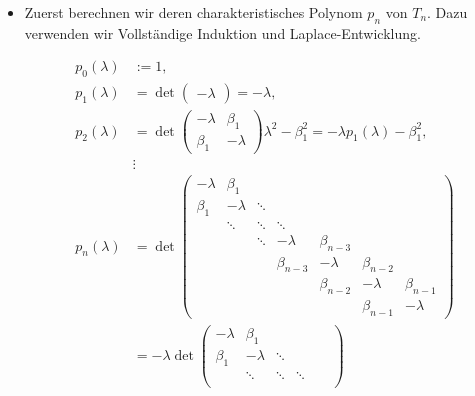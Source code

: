 \begin{solution}
\begin{itemize}

  \item Zuerst berechnen wir deren charakteristisches Polynom $p_n$ von $T_n$.
  Dazu verwenden wir Vollständige Induktion und Laplace-Entwicklung.

  \begin{align*}
    p_0(\lambda)
    & :=
    1, \\
    p_1(\lambda)
    & =
    \det
    \begin{pmatrix}
      -\lambda
    \end{pmatrix}
    =
    -\lambda, \\
    p_2(\lambda)
    & =
    \det
    \begin{pmatrix}
      -\lambda & \beta_1 \\
      \beta_1  & -\lambda
    \end{pmatrix}
    \lambda^2 - \beta_1^2
    =
    -\lambda p_1(\lambda) - \beta_1^2, \\
    & \vdots \\
    p_n(\lambda)
    & =
    \det
    \begin{pmatrix}
      -\lambda & \beta_1  &        &             &             &             &             \\
      \beta_1  & -\lambda & \ddots &             &             &             &             \\
              & \ddots   & \ddots & \ddots      &             &             &             \\
              &          & \ddots & -\lambda    & \beta_{n-3} &             &             \\
              &          &        & \beta_{n-3} & -\lambda    & \beta_{n-2} &             \\
              &          &        &             & \beta_{n-2} & -\lambda    & \beta_{n-1} \\
              &          &        &             &             & \beta_{n-1} & -\lambda
    \end{pmatrix} \\
    & =
    -\lambda
    \det
    \begin{pmatrix}
      -\lambda & \beta_1  &        &             &             &             \\
      \beta_1  & -\lambda & \ddots &             &             &             \\
              & \ddots   & \ddots & \ddots      &             &             \\

\end{pmatrix}
\end{align*}
\end{itemize}
\end{solution}
